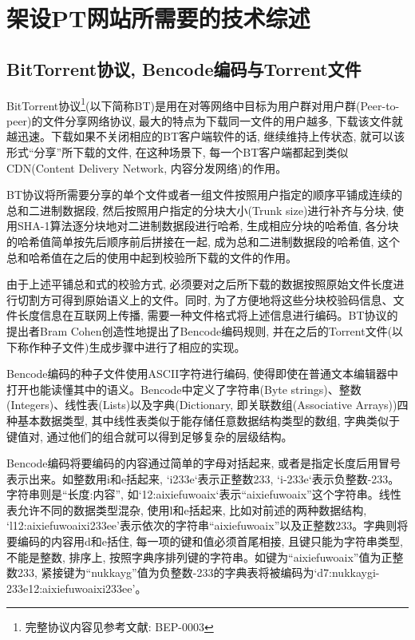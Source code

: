 \chapter{架设PT网站所需要的技术综述}

\section{BitTorrent协议, Bencode编码与Torrent文件}
\label{sec:BitorrentProtocol}

BitTorrent协议\footnote{完整协议内容见参考文献: BEP-0003\cite{bramcohen2008bep0003}}(以下简称BT)是用在对等网络中目标为用户群对用户群(Peer-to-peer)的文件分享网络协议, 最大的特点为下载同一文件的用户越多, 下载该文件就越迅速。下载如果不关闭相应的BT客户端软件的话, 继续维持上传状态, 就可以该形式``分享''所下载的文件, 在这种场景下, 每一个BT客户端都起到类似CDN(Content Delivery Network, 内容分发网络)的作用。

BT协议将所需要分享的单个文件或者一组文件按照用户指定的顺序平铺成连续的总和二进制数据段, 然后按照用户指定的分块大小(Trunk size)进行补齐与分块, 使用SHA-1算法逐分块地对二进制数据段进行哈希, 生成相应分块的哈希值, 各分块的哈希值简单按先后顺序前后拼接在一起, 成为总和二进制数据段的哈希值, 这个总和哈希值在之后的使用中起到校验所下载的文件的作用。

由于上述平铺总和式的校验方式, 必须要对之后所下载的数据按照原始文件长度进行切割方可得到原始语义上的文件。同时, 为了方便地将这些分块校验码信息、文件长度信息在互联网上传播, 需要一种文件格式将上述信息进行编码。BT协议的提出者Bram Cohen创造性地提出了Bencode编码规则, 并在之后的Torrent文件(以下称作种子文件)生成步骤中进行了相应的实现。

Bencode编码的种子文件使用ASCII字符进行编码, 使得即使在普通文本编辑器中打开也能读懂其中的语义。Bencode中定义了字符串(Byte strings)、整数(Integers)、线性表(Lists)以及字典(Dictionary, 即关联数组(Associative Arrays))四种基本数据类型, 其中线性表类似于能存储任意数据结构类型的数组, 字典类似于键值对, 通过他们的组合就可以得到足够复杂的层级结构。

Bencode编码将要编码的内容通过简单的字母对括起来\cite{wikieditors2019bencode}, 或者是指定长度后用冒号表示出来。如整数用i和e括起来, `i233e`表示正整数233, `i-233e`表示负整数-233。字符串则是``长度:内容'', 如`12:aixiefuwoaix`表示``aixiefuwoaix''这个字符串。线性表允许不同的数据类型混杂, 使用l和e括起来, 比如对前述的两种数据结构, `l12:aixiefuwoaixi\-233ee'表示依次的字符串``aixiefuwoaix''以及正整数233。字典则将要编码的内容用d和e括住, 每一项的键和值必须首尾相接, 且键只能为字符串类型, 不能是整数, 排序上, 按照字典序排列键的字符串。如键为``aixiefuwoaix''值为正整数233, 紧接键为``nukkayg''值为负整数-233的字典表将被编码为`d7:nukkaygi-233e12:aixiefuwoaixi233ee'。

